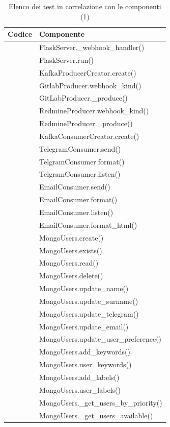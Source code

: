 		\begin{table}[H]
			\centering
			{\def\arraystretch{1.4}
			\begin{tabularx}{\textwidth}{cY}
				\textbf{Codice} & \textbf{Componente} \\
				\toprule
				\addtotu & FlaskServer.\_webhook\_handler() \\
				\addtotu & FlaskServer.run() \\

				\addtotu & KafkaProducerCreator.create() \\
				\addtotu & GitlabProducer.webhook\_kind() \\
				\addtotu & GitLabProducer.\_produce() \\
				\addtotu & RedmineProducer.webhook\_kind() \\
				\addtotu & RedmineProducer.\_produce() \\

				\addtotu & KafkaConsumerCreator.create() \\
				\addtotu & TelegramConsumer.send() \\
				\addtotu & TelgramConsumer.format() \\
				\addtotu & TelgramConsumer.listen() \\

				\addtotu & EmailConsumer.send() \\
				\addtotu & EmailConsumer.format() \\
				\addtotu & EmailConsumer.listen() \\
				\addtotu & EmailConsumer.format\_html() \\

				\addtotu & MongoUsers.create() \\
				\addtotu & MongoUsers.exists() \\
				\addtotu & MongoUsers.read() \\
				\addtotu & MongoUsers.delete() \\
				\addtotu & MongoUsers.update\_name() \\
				\addtotu & MongoUsers.update\_surname() \\
				\addtotu & MongoUsers.update\_telegram() \\
				\addtotu & MongoUsers.update\_email() \\
				\addtotu & MongoUsers.update\_user\_preference() \\
				\addtotu & MongoUsers.add\_keywords() \\
				\addtotu & MongoUsers.user\_keywords() \\
				\addtotu & MongoUsers.add\_labels() \\
				\addtotu & MongoUsers.user\_labels() \\
				\addtotu & MongoUsers.\_get\_users\_by\_priority() \\
				\addtotu & MongoUsers.\_get\_users\_available() \\

				\bottomrule
			\end{tabularx}}
			\caption{Elenco dei test in correlazione con le componenti (1)}
		\end{table}


